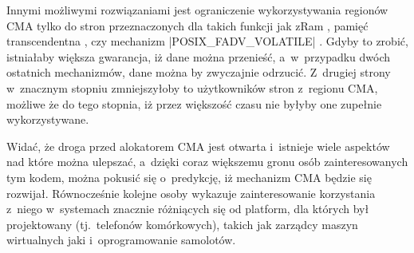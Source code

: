 Innymi możliwymi rozwiązaniami jest ograniczenie wykorzystywania
regionów CMA tylko do stron przeznaczonych dla takich funkcji jak zRam
\autocite{patch:zram}, pamięć transcendentna
\autocite{bib:transcendent}, czy mechanizm \code|POSIX_FADV_VOLATILE|
\autocite{bib:fadv-volatile}.  Gdyby to zrobić, istniałaby większa
gwarancja, iż dane można przenieść, a~w~przypadku dwóch ostatnich
mechanizmów, dane można by zwyczajnie odrzucić.  Z~drugiej strony
w~znacznym stopniu zmniejszyłoby to użytkowników stron z~regionu CMA,
możliwe że do tego stopnia, iż przez większość czasu nie byłyby one
zupełnie wykorzystywane.

Widać, że droga przed alokatorem CMA jest otwarta i~istnieje wiele
aspektów nad które można ulepszać, a~dzięki coraz większemu gronu osób
zainteresowanych tym kodem, można pokusić się o~predykcję, iż
mechanizm CMA będzie się rozwijał.  Równocześnie kolejne osoby
wykazuje zainteresowanie korzystania z~niego w~systemach znacznie
różniących się od platform, dla których był projektowany
(tj.\ telefonów komórkowych), takich jak zarządcy maszyn wirtualnych
jaki i~oprogramowanie samolotów.
